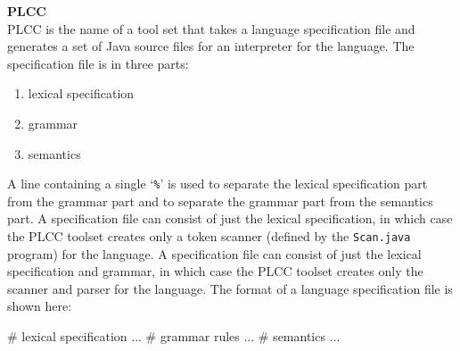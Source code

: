 \begin{minipage}[t]{\sw}
\slidenumber
\LARGE
{\bf PLCC}\\
\Large
PLCC is the name of a tool set
that takes a language specification file
and generates a set of Java source files
for an interpreter for the language.\exx
The specification file is in three parts:
\begin{enumerate}
\parskip -0.5ex
\item lexical specification
\item grammar
\item semantics 
\end{enumerate}
A line containing a single `\verb'%'' is used
to separate the lexical specification part from the grammar part
and to separate the grammar part from the semantics part.\exx
A specification file can consist
of just the lexical specification,
in which case the PLCC toolset creates only
a token scanner (defined by the \verb'Scan.java' program) for the language.\exx
A specification file can consist
of just the lexical specification and grammar,
in which case the PLCC toolset creates only
the scanner and parser for the language.\exx
The format of a language specification file 
is shown here:
\large
\begin{qv}
# lexical specification
...
%
# grammar rules
...
%
# semantics
...
\end{qv}
\end{minipage}
\clearpage
